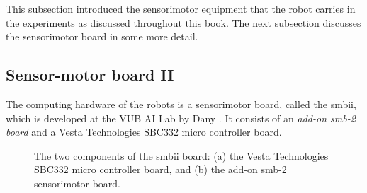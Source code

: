 \bigskip\noindent
This subsection introduced the sensorimotor equipment that the robot carries in the experiments as discussed throughout this book. The next subsection discusses the sensorimotor board in some more detail.

\subsection{Sensor-motor board II}\label{setup:smbii}


The computing hardware of the robots is a sensorimotor board, called the {\sc smbii}, which is developed at the VUB AI Lab by Dany \citet{vereertbrugghen:1996}. It consists of an {\em add-on {\sc smb}-2 board} and a Vesta Technologies SBC332 micro controller board.

\begin{figure}
\centering
{}
\caption{The two components of the {\sc smbii} board: (a) the Vesta Technologies SBC332 micro controller board, and (b) the add-on {\sc smb}-2 sensorimotor board.}
\end{figure}

